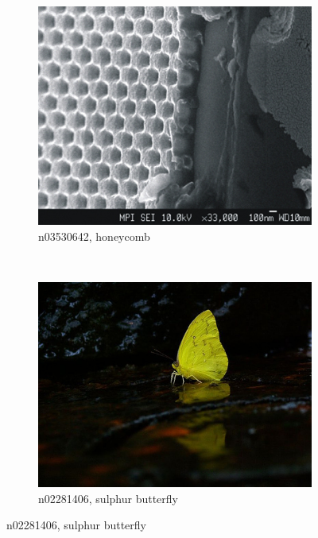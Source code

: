 \documentclass[11pt, a4paper]{article}
\begin{document}
\begin{figure}[h!tb]
\begin{subfigure}[t]{0.30\textwidth}
        \includegraphics[width=\textwidth]{imagenet/examples/n03530642_10006.JPEG}
        \caption{n03530642, honeycomb}
        \label{fig:imagenet-examples-2}
    \end{subfigure}
    ~ %
    \begin{subfigure}[t]{0.30\textwidth}
    		\centering
        \includegraphics[width=\textwidth]{imagenet/examples/n02281406_10006.JPEG}
        \caption{n02281406, sulphur butterfly}
        \label{fig:imagenet-examples-3}
    \end{subfigure}
    

\end{figure}
\end{document}
